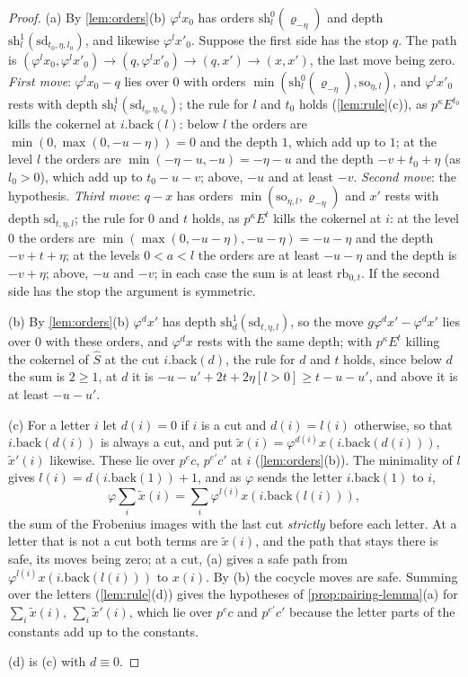\begin{proof}
(a) By \cref{lem:orders}(b) $\varphi^lx_0$ has orders $\mathrm{sh}^0_l(\varrho_{-\eta})$ and depth $\mathrm{sh}^1_l(\mathrm{sd}_{t_0,\eta,l_0})$, and likewise $\varphi^lx'_0$. Suppose the first side has the stop $q$. The path is $(\varphi^lx_0,\varphi^lx'_0)\to(q,\varphi^lx'_0)\to(q,x')\to(x,x')$, the last move being zero.
\emph{First move}: $\varphi^lx_0-q$ lies over $0$ with orders $\min(\mathrm{sh}^0_l(\varrho_{-\eta}),\mathrm{so}_{\eta,l})$, and $\varphi^lx'_0$ rests with depth $\mathrm{sh}^1_l(\mathrm{sd}_{t_0,\eta,l_0})$; the rule for $l$ and $t_0$ holds (\cref{lem:rule}(c)), as $p^\kappa E^{t_0}$ kills the cokernel at $i.\mathrm{back}(l)$:
below $l$ the orders are $\min(0,\max(0,-u-\eta))=0$ and the depth $1$, which add up to $1$; at the level $l$ the orders are $\min(-\eta-u,-u)=-\eta-u$ and the depth $-v+t_0+\eta$ (as $l_0>0$), which add up to $t_0-u-v$; above, $-u$ and at least $-v$. \emph{Second move}: the hypothesis. \emph{Third move}: $q-x$ has orders
$\min(\mathrm{so}_{\eta,l},\varrho_{-\eta})$ and $x'$ rests with depth $\mathrm{sd}_{t,\eta,l}$; the rule for $0$ and $t$ holds, as $p^\kappa E^t$ kills the cokernel at $i$: at the level $0$ the orders are $\min(\max(0,-u-\eta),-u-\eta)=-u-\eta$ and the depth $-v+t+\eta$; at the levels $0<a<l$ the orders
are at least $-u-\eta$ and the depth is $-v+\eta$; above, $-u$ and $-v$; in each case the sum is at least $\mathrm{rb}_{0,t}$. If the second side has the stop the argument is symmetric.

(b) By \cref{lem:orders}(b) $\varphi^dx'$ has depth $\mathrm{sh}^1_d(\mathrm{sd}_{t,\eta,l})$, so the move $g\varphi^dx'-\varphi^dx'$ lies over $0$ with these orders, and $\varphi^dx$ rests with the same depth; with $p^\kappa E^t$ killing the cokernel of $\hat S$ at the cut $i.\mathrm{back}(d)$, the rule for $d$ and $t$ holds, since below $d$ the sum is $2\ge1$, at $d$ it is
$-u-u'+2t+2\eta[l>0]\ge t-u-u'$, and above it is at least $-u-u'$.

(c) For a letter $i$ let $d(i)=0$ if $i$ is a cut and $d(i)=l(i)$ otherwise, so that $i.\mathrm{back}(d(i))$ is always a cut, and put $\tilde x(i)=\varphi^{d(i)}x(i.\mathrm{back}(d(i)))$, $\tilde x'(i)$ likewise. These lie over $p^ec$, $p^{e'}c'$ at $i$ (\cref{lem:orders}(b)). The minimality of $l$ gives $l(i)=d(i.\mathrm{back}(1))+1$, and as $\varphi$ sends
the letter $i.\mathrm{back}(1)$ to $i$,
\[\varphi\sum_i\tilde x(i)=\sum_i\varphi^{l(i)}x(i.\mathrm{back}(l(i))),\]
the sum of the Frobenius images with the last cut \emph{strictly} before each letter. At a letter that is not a cut both terms are $\tilde x(i)$, and the path that stays there is safe, its moves being zero; at a cut, (a) gives a safe path from $\varphi^{l(i)}x(i.\mathrm{back}(l(i)))$ to $x(i)$. By (b) the cocycle moves are
safe. Summing over the letters (\cref{lem:rule}(d)) gives the hypotheses of \cref{prop:pairing-lemma}(a) for $\sum_i\tilde x(i)$, $\sum_i\tilde x'(i)$, which lie over $p^ec$ and $p^{e'}c'$ because the letter parts of the constants add up to the constants.

(d) is (c) with $d\equiv0$.
\end{proof}

